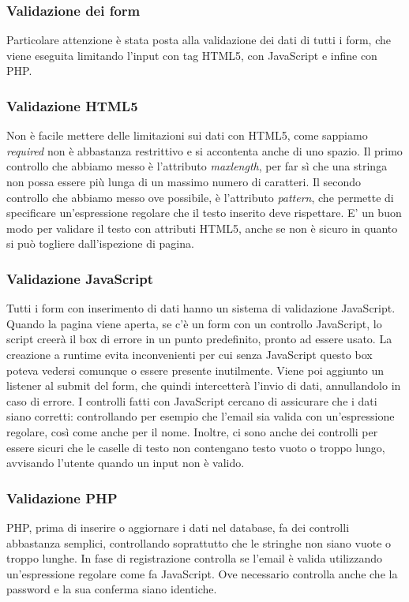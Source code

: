 \documentclass[12pt]{article}
\begin{document}
	\subsubsection{Validazione dei form}
	Particolare attenzione è stata posta alla validazione dei dati di tutti i form, che viene eseguita limitando l'input con tag HTML5, con JavaScript e infine con PHP. 
	
	\subsubsection{Validazione HTML5}
	Non è facile mettere delle limitazioni sui dati con HTML5, come sappiamo \textit{required} non è abbastanza restrittivo e si accontenta anche di uno spazio. Il primo controllo che abbiamo messo è l'attributo \textit{maxlength}, per far sì che una stringa non possa essere più lunga di un massimo numero di caratteri. Il secondo controllo che abbiamo messo ove possibile, è l'attributo \textit{pattern}, che permette di specificare un'espressione regolare che il testo inserito deve rispettare. E' un buon modo per validare il testo con attributi HTML5, anche se non è sicuro in quanto si può togliere dall'ispezione di pagina.
	
	\subsubsection{Validazione JavaScript}
	Tutti i form con inserimento di dati hanno un sistema di validazione JavaScript. Quando la pagina viene aperta, se c'è un form con un controllo JavaScript, lo script creerà il box di errore in un punto predefinito, pronto ad essere usato. La creazione a runtime evita inconvenienti per cui senza JavaScript questo box poteva vedersi comunque o essere presente inutilmente. Viene poi aggiunto un listener al submit del form, che quindi intercetterà l'invio di dati, annullandolo in caso di errore. I controlli fatti con JavaScript cercano di assicurare che i dati siano corretti: controllando per esempio che l'email sia valida con un'espressione regolare, così come anche per il nome. Inoltre, ci sono anche dei controlli per essere sicuri che le caselle di testo non contengano testo vuoto o troppo lungo, avvisando l'utente quando un input non è valido.
	
	\subsubsection{Validazione PHP}
	PHP, prima di inserire o aggiornare i dati nel database, fa dei controlli abbastanza semplici, controllando soprattutto che le stringhe non siano vuote o troppo lunghe. In fase di registrazione controlla se l'email è valida utilizzando un'espressione regolare come fa JavaScript. Ove necessario controlla anche che la password e la sua conferma siano identiche.
	
\end{document}
